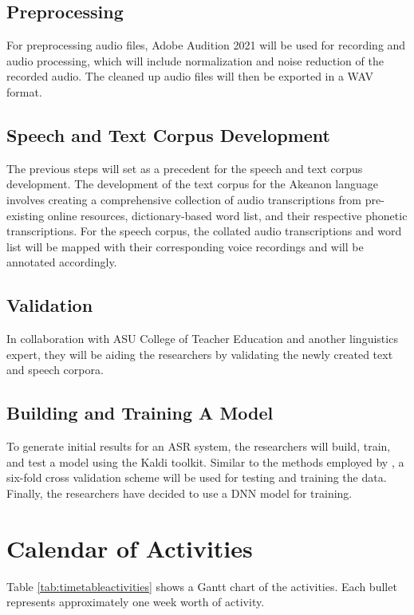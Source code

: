 \subsection{Preprocessing}
For preprocessing audio files, Adobe Audition 2021 will be used for recording and audio processing, which will include normalization and noise reduction of the recorded audio. The cleaned up audio files will then be exported in a WAV format.

\subsection{Speech and Text Corpus Development}
The previous steps will set as a precedent for the speech and text corpus development. The development of the text corpus for the Akeanon language involves creating a comprehensive collection of audio transcriptions from pre-existing online resources, dictionary-based word list, and their respective phonetic transcriptions. For the speech corpus, the collated audio transcriptions and word list will be mapped with their corresponding voice recordings and will be annotated accordingly.

\subsection{Validation}
In collaboration with ASU College of Teacher Education and another linguistics expert, they will be aiding the researchers by validating the newly created text and speech corpora.

\subsection{Building and Training A Model}
To generate initial results for an ASR system, the researchers will build, train, and test a model using the Kaldi toolkit. Similar to the methods employed by , a six-fold cross validation scheme will be used for testing and training the data. Finally, the researchers have decided to use a DNN model for training.

\section{Calendar of Activities}


Table \ref{tab:timetableactivities} shows a Gantt chart of the activities.  Each bullet represents approximately
one week worth of activity.

